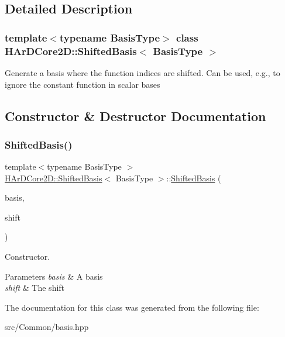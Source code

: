 \subsection{Detailed Description}
\subsubsection*{template$<$typename Basis\+Type$>$\newline
class H\+Ar\+D\+Core2\+D\+::\+Shifted\+Basis$<$ Basis\+Type $>$}

Generate a basis where the function indices are shifted. Can be used, e.\+g., to ignore the constant function in scalar bases 

\subsection{Constructor \& Destructor Documentation}
\mbox{\label{classHArDCore2D_1_1ShiftedBasis_adb935c3f74623dbd29c124c0c6dc605e}} 
\subsubsection{\texorpdfstring{Shifted\+Basis()}{ShiftedBasis()}}
{\footnotesize\ttfamily template$<$typename Basis\+Type $>$ \\
\hyperlink{classHArDCore2D_1_1ShiftedBasis}{H\+Ar\+D\+Core2\+D\+::\+Shifted\+Basis}$<$ Basis\+Type $>$\+::\hyperlink{classHArDCore2D_1_1ShiftedBasis}{Shifted\+Basis} (\begin{DoxyParamCaption}\item[{const Basis\+Type \&}]{basis,  }\item[{const int}]{shift }\end{DoxyParamCaption})\hspace{0.3cm}{\ttfamily [inline]}}



Constructor. 


\begin{DoxyParams}{Parameters}
{\em basis} & A basis \\
\hline
{\em shift} & The shift \\
\hline
\end{DoxyParams}


The documentation for this class was generated from the following file\+:\begin{DoxyCompactItemize}
\item 
src/\+Common/basis.\+hpp\end{DoxyCompactItemize}
